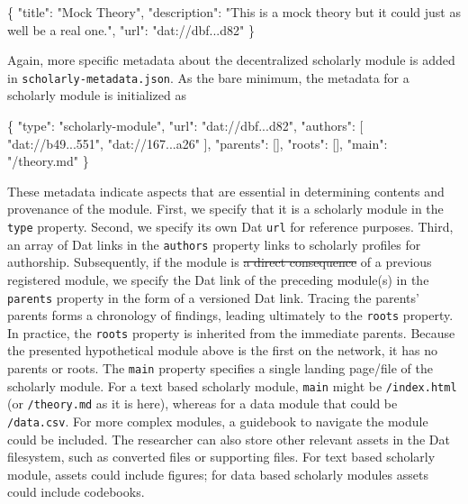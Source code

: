 \documentclass[publications,article,submit,moreauthors,pdftex,10pt,a4paper]{Definitions/mdpi}
\newenvironment{Shaded}{\begin{snugshade}}{\end{snugshade}}
\newcommand{\DataTypeTok}[1]{\textcolor[rgb]{0.13,0.29,0.53}{#1}}
\newcommand{\FunctionTok}[1]{\textcolor[rgb]{0.00,0.00,0.00}{#1}}
\newcommand{\OtherTok}[1]{\textcolor[rgb]{0.56,0.35,0.01}{#1}}
\newcommand{\StringTok}[1]{\textcolor[rgb]{0.31,0.60,0.02}{#1}}
\providecommand{\DIFaddtex}[1]{{\protect\color{blue}\uwave{#1}}} %
\providecommand{\DIFdeltex}[1]{{\protect\color{red}\sout{#1}}}                      %
\providecommand{\DIFaddbegin}{} %
\providecommand{\DIFaddend}{} %
\providecommand{\DIFdelbegin}{} %
\providecommand{\DIFdelend}{} %
\providecommand{\DIFadd}[1]{\texorpdfstring{\DIFaddtex{#1}}{#1}} %
\providecommand{\DIFdel}[1]{\texorpdfstring{\DIFdeltex{#1}}{}} %
\newcommand{\DIFscaledelfig}{0.5}
\newlength{\DIFdelgraphicswidth} %
\newlength{\DIFdelgraphicsheight} %
\newcommand{\DIFaddincludegraphics}[2][]{{\color{blue}\fbox{\DIFOincludegraphics[#1]{#2}}}} %
\newcommand{\DIFdelincludegraphics}[2][]{%
\sbox{\DIFdelgraphicsbox}{\DIFOincludegraphics[#1]{#2}}%
\settoboxwidth{\DIFdelgraphicswidth}{\DIFdelgraphicsbox} %
\settoboxtotalheight{\DIFdelgraphicsheight}{\DIFdelgraphicsbox} %
\scalebox{\DIFscaledelfig}{%
\parbox[b]{\DIFdelgraphicswidth}{\usebox{\DIFdelgraphicsbox}\\[-\baselineskip] \rule{\DIFdelgraphicswidth}{0em}}\llap{\resizebox{\DIFdelgraphicswidth}{\DIFdelgraphicsheight}{%
\setlength{\unitlength}{\DIFdelgraphicswidth}%
\begin{picture}(1,1)%
\thicklines\linethickness{2pt} %
{\color[rgb]{1,0,0}\put(0,0){\framebox(1,1){}}}%
{\color[rgb]{1,0,0}\put(0,0){\line( 1,1){1}}}%
{\color[rgb]{1,0,0}\put(0,1){\line(1,-1){1}}}%
\end{picture}%
}\hspace*{3pt}}} %
} %
\DeclareRobustCommand{\DIFaddbegin}{\DIFOaddbegin \let\includegraphics\DIFaddincludegraphics} %
\DeclareRobustCommand{\DIFaddend}{\DIFOaddend \let\includegraphics\DIFOincludegraphics} %
\DeclareRobustCommand{\DIFdelbegin}{\DIFOdelbegin \let\includegraphics\DIFdelincludegraphics} %
\DeclareRobustCommand{\DIFdelend}{\DIFOaddend \let\includegraphics\DIFOincludegraphics} %
\begin{document}
\begin{Shaded}
\begin{Highlighting}[]
\FunctionTok{\{}
  \DataTypeTok{"title"}\FunctionTok{:} \StringTok{"Mock Theory"}\FunctionTok{,}
  \DataTypeTok{"description"}\FunctionTok{:} \StringTok{"This is a mock theory but it could just as well be}
  \StringTok{a real one."}\FunctionTok{,}
  \DataTypeTok{"url"}\FunctionTok{:} \StringTok{"dat://dbf...d82"}
\FunctionTok{\}}
\end{Highlighting}
\end{Shaded}

Again, more specific metadata about the decentralized scholarly module
is added in \texttt{scholarly-metadata.json}. As the bare minimum, the
metadata for a scholarly module is initialized as

\begin{Shaded}
\begin{Highlighting}[]
\FunctionTok{\{}
  \DataTypeTok{"type"}\FunctionTok{:} \StringTok{"scholarly-module"}\FunctionTok{,}
  \DataTypeTok{"url"}\FunctionTok{:} \StringTok{"dat://dbf...d82"}\FunctionTok{,}
  \DataTypeTok{"authors"}\FunctionTok{:} \OtherTok{[}
    \StringTok{"dat://b49...551"}\OtherTok{,}
    \StringTok{"dat://167...a26"}
  \OtherTok{]}\FunctionTok{,}
  \DataTypeTok{"parents"}\FunctionTok{:} \OtherTok{[]}\FunctionTok{,}
  \DataTypeTok{"roots"}\FunctionTok{:} \OtherTok{[]}\FunctionTok{,}
  \DataTypeTok{"main"}\FunctionTok{:} \StringTok{"/theory.md"}
\FunctionTok{\}}
\end{Highlighting}
\end{Shaded}


These metadata indicate aspects that are essential in determining
contents and provenance of the module. First, we specify that it is a
scholarly module in the \texttt{type} property. Second, we specify its
own Dat \texttt{url} for reference purposes. Third, an array of Dat
links in the \texttt{authors} property links to scholarly profiles for
authorship. Subsequently, if the module is \DIFdelbegin \DIFdel{a direct consequence }\DIFdelend \DIFaddbegin \DIFadd{the following step }\DIFaddend of a
previous registered module, we specify the Dat link of the preceding
module(s) in the \texttt{parents} property in the form of a versioned
Dat link. Tracing the parents' parents forms a chronology of findings,
leading ultimately to the \texttt{roots} property. In practice, the
\texttt{roots} property is inherited from the immediate parents. Because
the presented hypothetical module above is the first on the network, it
has no parents or roots. The \texttt{main} property specifies a single
landing page/file of the scholarly module. For a text based scholarly
module, \texttt{main} might be \texttt{/index.html} (or
\texttt{/theory.md} as it is here), whereas for a data module that could
be \texttt{/data.csv}. For more complex modules, a guidebook to navigate
the module could be included. The researcher can also store other
relevant assets in the Dat filesystem, such as converted files or
supporting files. For text based scholarly module, assets could include
figures; for data based scholarly modules assets could include
codebooks.
\end{document}
